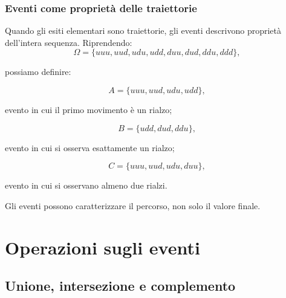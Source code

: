 \documentclass[handout]{beamer}%
\providecommand{\1}{\mathbf{1}}
\providecommand{\QTR}[2]{\csname #1\endcsname{#2}}
\begin{document}
\begin{frame}%
%

\frametitle{Eventi come propriet\`{a} delle traiettorie}%


Quando gli esiti elementari sono traiettorie, gli eventi descrivono
propriet\`{a} dell'intera sequenza. Riprendendo:
\[
\Omega=\{uuu,uud,udu,udd,duu,dud,ddu,ddd\},
\]


possiamo definire:%

\[
A=\{uuu,uud,udu,udd\},
\]


evento in cui il primo movimento \`{e} un rialzo;%

\[
B=\{udd,dud,ddu\},
\]


evento in cui si osserva esattamente un rialzo;%

\[
C=\{uuu,uud,udu,duu\},
\]


evento in cui si osservano almeno due rialzi.

\medskip

\begin{center}
{\small Gli eventi possono caratterizzare il percorso, non solo il valore
finale.}
\end{center}%

\transboxout
\end{frame}%




\section{Operazioni sugli eventi}

\subsection{Unione, intersezione e complemento}%
\end{document}
